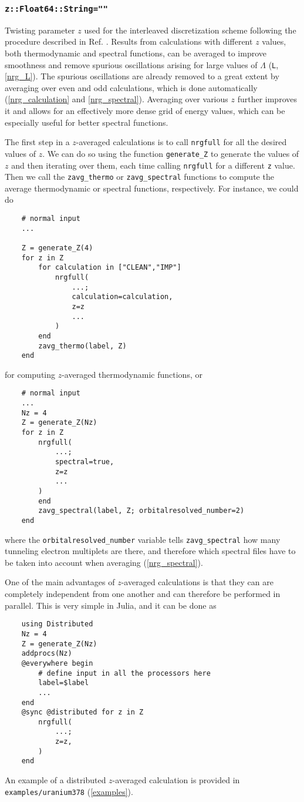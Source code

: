 \documentclass[notitlepage]{article}
\begin{document}
\subsubsection{\texttt{z::Float64::String=""}}
\label{nrg_z}
Twisting parameter $z$ used for the interleaved
discretization scheme following the procedure described in
Ref. \cite{campo2005}. Results from calculations with
different $z$ values, both thermodynamic and spectral
functions, can be averaged to improve smoothness and remove
spurious oscillations arising for large values of $\Lambda$
(\texttt{L}, \ref{nrg_L}). The spurious oscillations are
already removed to a great extent by averaging over even and
odd calculations, which is done automatically
(\ref{nrg_calculation} and \ref{nrg_spectral}). Averaging
over various $z$ further improves it and allows for an
effectively more dense grid of energy values, which can be
especially useful for better spectral functions.
\par
The first step in a $z$-averaged calculations is to call
\texttt{nrgfull} for all the desired values of $z$. We can
do so using the function \texttt{generate\_Z} to generate
the values of $z$ and then iterating over them, each time
calling \texttt{nrgfull} for a different \texttt{z} value. 
Then we call the \texttt{zavg\_thermo} or
\texttt{zavg\_spectral} functions to compute the average
thermodynamic or spectral functions, respectively. For
instance, we could do
\begin{verbatim}
    # normal input
    ...

    Z = generate_Z(4)
    for z in Z
        for calculation in ["CLEAN","IMP"]
            nrgfull(
                ...;
                calculation=calculation,
                z=z
                ...
            )
        end
        zavg_thermo(label, Z)
    end
\end{verbatim}
for computing $z$-averaged thermodynamic functions, or
\begin{verbatim}
    # normal input
    ...
    Nz = 4
    Z = generate_Z(Nz)
    for z in Z
        nrgfull(
            ...;
            spectral=true,
            z=z
            ...
        )
        end
        zavg_spectral(label, Z; orbitalresolved_number=2)
    end
\end{verbatim}
where the \texttt{orbitalresolved\_number} variable tells
\texttt{zavg\_spectral} how many tunneling electron
multiplets are there, and therefore which spectral files
have to be taken into account when averaging
(\ref{nrg_spectral}). 
\par
One of the main advantages of $z$-averaged calculations is
that they can are completely independent from one another
and can therefore be performed in parallel. This is very
simple in Julia, and it can be done as
\begin{verbatim}
    using Distributed
    Nz = 4
    Z = generate_Z(Nz)
    addprocs(Nz)
    @everywhere begin
        # define input in all the processors here
        label=$label
        ...
    end
    @sync @distributed for z in Z
        nrgfull(
            ...;
            z=z,
        )
    end
\end{verbatim}
An example of a distributed $z$-averaged calculation is
provided in \texttt{examples/uranium378} (\ref{examples}).
\end{document}
